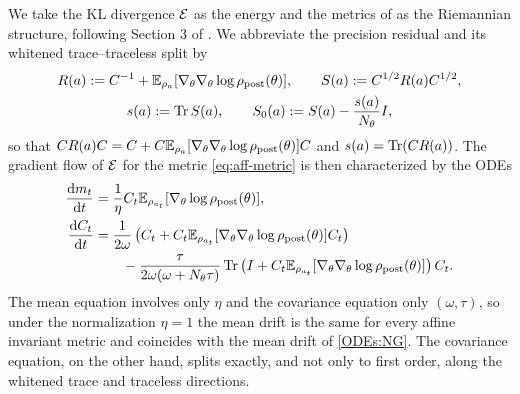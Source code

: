 We take the KL divergence $\mathcal{E}$ as the energy and the metrics of  as the Riemannian structure, following Section 3 of \cite{chen2023sampling}. We abbreviate the precision residual and its whitened trace--traceless split by
\begin{equation}\label{eq:aff-residual}
    \begin{gathered}
        R(a) := C^{-1} + \mathbb{E}_{\rho_a} [\nabla_\theta \nabla_\theta \log \rho_{\mathrm{post}}(\theta)], \qquad S(a) := C^{1/2} R(a) C^{1/2}, \\
        s(a) := \operatorname{Tr} S(a), \qquad S_0(a) := S(a) - \frac{s(a)}{N_\theta} I,
    \end{gathered}
\end{equation}
so that $C R(a) C = C + C \mathbb{E}_{\rho_a}[\nabla_\theta \nabla_\theta \log \rho_{\mathrm{post}}(\theta)] C$ and $s(a) = \operatorname{Tr}(C R(a))$. The gradient flow of $\mathcal{E}$ for the metric \eqref{eq:aff-metric} is then characterized by the ODEs
\begin{equation}\label{ODEs:affine}
    \begin{aligned}
        \frac{\mathrm{d} m_t}{\mathrm{d} t} &= \frac{1}{\eta} C_t \mathbb{E}_{\rho_{a_t}} [\nabla_\theta \log \rho_{\mathrm{post}}(\theta)], \\
        \frac{\mathrm{d} C_t}{\mathrm{d} t} &= \frac{1}{2 \omega} \left( C_t + C_t \mathbb{E}_{\rho_{a_t}} [\nabla_\theta \nabla_\theta \log \rho_{\mathrm{post}}(\theta)] C_t \right) \\
        &\qquad - \frac{\tau}{2\omega (\omega + N_\theta \tau)} \operatorname{Tr} \left( I + C_t \mathbb{E}_{\rho_{a_t}} [\nabla_\theta \nabla_\theta \log \rho_{\mathrm{post}}(\theta)] \right) C_t.
    \end{aligned}
\end{equation}
The mean equation involves only $\eta$ and the covariance equation only $(\omega, \tau)$, so under the normalization $\eta = 1$ the mean drift is the same for every affine invariant metric and coincides with the mean drift of \eqref{ODEs:NG}. The covariance equation, on the other hand, splits exactly, and not only to first order, along the whitened trace and traceless directions.

